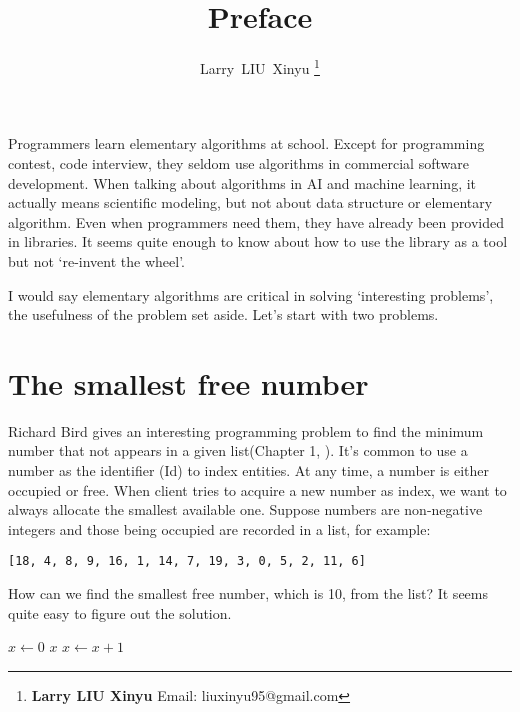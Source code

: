 \documentclass[b5paper]{article}
\begin{document}
\title{Preface}

\author{Larry~LIU~Xinyu
\thanks{{\bfseries Larry LIU Xinyu } \newline
  Email: liuxinyu95@gmail.com \newline}
  }

\maketitle
\fi


Programmers learn elementary algorithms at school. Except for programming contest, code interview, they seldom use algorithms in commercial software development. When talking about algorithms in AI and machine learning, it actually means scientific modeling, but not about data structure or elementary algorithm. Even when programmers need them, they have already been provided in libraries. It seems quite enough to know about how to use the library as a tool but not `re-invent the wheel'.

I would say elementary algorithms are critical in solving `interesting problems', the usefulness of the problem set aside. Let's start with two problems.

\section{The smallest free number}
\label{min-free} 

Richard Bird gives an interesting programming problem to find the minimum number that not appears in a given list(Chapter 1, \cite{Bird-book}). It's common to use a number as the identifier (Id) to index entities. At any time, a number is either occupied or free. When client tries to acquire a new number as index, we want to always allocate the smallest available one. Suppose numbers are non-negative integers and those being occupied are recorded in a list, for example:

\begin{verbatim}
[18, 4, 8, 9, 16, 1, 14, 7, 19, 3, 0, 5, 2, 11, 6]
\end{verbatim}

How can we find the smallest free number, which is 10, from the list? It seems quite easy to figure out the solution.

\begin{algorithmic}[1]
  \State $x \gets 0$
  \Loop
      \State \Return $x$
    \Else
      \State $x \gets x + 1$
    \EndIf
  \EndLoop
\EndFunction
\end{algorithmic}
\end{document}
